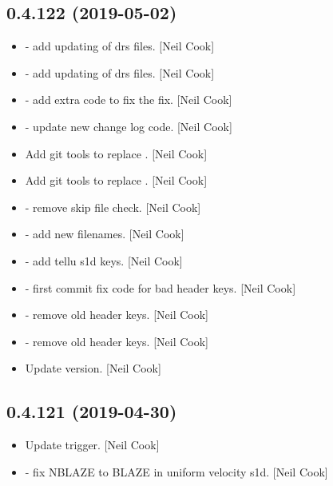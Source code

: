 \documentclass[a4paper,10pt,english]{report}
\begin{document}
\subsection{0.4.122 (2019-05-02)}
\label{\detokenize{misc/changelog:id139}}\begin{itemize}
\item {} 
 - add updating of drs files. {[}Neil Cook{]}

\item {} 
 - add updating of drs files. {[}Neil Cook{]}

\item {} 
 - add extra code to fix the fix. {[}Neil Cook{]}

\item {} 
 - update new change log code. {[}Neil Cook{]}

\item {} 
Add git tools to replace . {[}Neil Cook{]}

\item {} 
Add git tools to replace . {[}Neil Cook{]}

\item {} 
 - remove skip file check. {[}Neil Cook{]}

\item {} 
 - add new filenames. {[}Neil Cook{]}

\item {} 
 - add tellu s1d keys. {[}Neil Cook{]}

\item {} 
 - first commit fix code for bad header keys.
{[}Neil Cook{]}

\item {} 
 - remove old header keys. {[}Neil Cook{]}

\item {} 
 - remove old header keys. {[}Neil Cook{]}

\item {} 
Update version. {[}Neil Cook{]}

\end{itemize}


\subsection{0.4.121 (2019-04-30)}
\label{\detokenize{misc/changelog:id140}}\begin{itemize}
\item {} 
Update trigger. {[}Neil Cook{]}

\item {} 
 - fix NBLAZE to BLAZE in uniform velocity s1d. {[}Neil
Cook{]}

\end{itemize}
\end{document}
